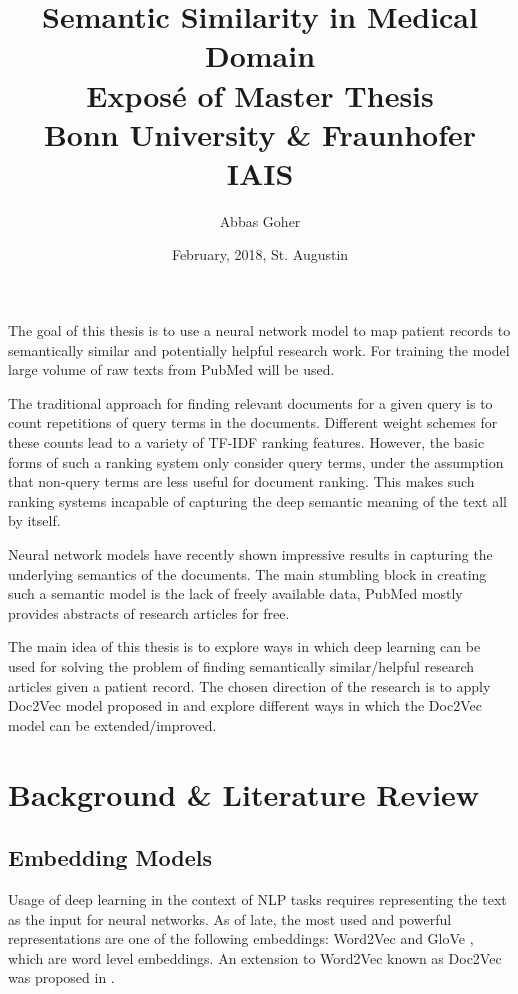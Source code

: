 \documentclass[12pt,a4paper] {article}
\begin{document}
	
	\title{Semantic Similarity in Medical Domain \\ \hphantom \newline
		\large     Expos\'{e} of Master Thesis
		\\Bonn University \& Fraunhofer IAIS}
	\author{Abbas Goher}
	\date{February, 2018, St. Augustin}
	\maketitle
	
	The goal of this thesis is to use a neural network model to map patient records to semantically similar and potentially helpful research work. For training the model large volume of raw texts from PubMed \cite{pubmed}  will be used.
	
	
	The traditional approach for finding relevant documents for a given query is to count repetitions of query terms in the documents. Different weight schemes for these counts lead to a variety of TF-IDF ranking features. However, the basic forms of such a ranking system only consider query terms, under the assumption that non-query terms are less useful for document ranking. This makes such ranking systems incapable of capturing the deep semantic meaning of the text all by itself. 
	
	Neural network models have recently shown impressive results in capturing the underlying semantics of the documents\cite{Bengio2006}.
	The main stumbling block in creating such a semantic model is the lack of freely available data, PubMed mostly provides abstracts of research articles for free. 
	
	The main idea of this thesis is to explore ways in which deep learning can be used for solving the problem of finding semantically similar/helpful research articles given a patient record. The chosen direction of the research is to apply Doc2Vec model proposed in \cite{le2014distributed} and explore different ways in which the Doc2Vec model can be extended/improved.
	
	\section*{Background \& Literature Review}
	
	\subsection*{Embedding Models}
	Usage of deep learning in the context of NLP tasks requires representing the text as the input for neural networks. As of late, the most used and powerful representations are one of the following embeddings: Word2Vec \cite{mikolov2013efficient} and GloVe \cite{pennington2014glove}, which are word level embeddings. An extension to Word2Vec known as Doc2Vec was proposed in \cite{le2014distributed}.  
	
\end{document}
